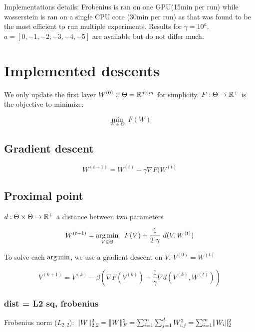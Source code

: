 Implementations details: Frobenius is ran on one GPU(15min per run) while wasserstein is ran on a single CPU core (30min per run) as that was found to be the most efficient to run multiple experiments. Results for $\gamma=10^{a}$, $a=[0, -1, -2, -3, -4, -5]$ are available but do not differ much.

\section{Implemented descents}

We only update the first layer $W^{(0)} \in \Theta = \mathbb{R}^{d \times m}$ for simplicity. $F : \Theta \rightarrow \mathbb{R}^+$ is the objective to minimize.

\begin{equation}
	\min_{W \in \Theta} \ F(W)
\end{equation}

\subsection{Gradient descent}

\begin{equation}
	W^{(t+1)} = W^{(t)} - \gamma \nabla F(W^{(t)}
\end{equation}

\subsection{Proximal point}

$d: \Theta \times \Theta \rightarrow \mathbb{R}^+$ a distance between two parameters

\begin{equation}
	W^{(t+1)} = \argmin_{V \in \Theta} \ \  F(V) + \frac{1}{2 ~ \gamma} ~ d(V, W^{(t)})
\end{equation}

To solve each $\operatorname*{arg\,min}$, we use a gradient descent on $V$. $V^{(0)} = W^{(t)}$

\begin{equation}
	V^{(k+1)} = V^{(k)} - \beta \left(\nabla F(V^{(k)}) - \frac{1}{\gamma} \nabla d(V^{(k)}, W^{(t)})\right)
\end{equation}

\subsubsection{dist = L2 sq, frobenius}

Frobenius norm ($L_{2,2}$): $\lVert W\rVert_{2,2}^2 = \lVert W\rVert_F^2 = \sum_{i=1}^{m} \sum_{j=1}^{d} W_{i, j}^2 = \sum_{i=1}^{m} \lVert W_i\rVert_2^2$

